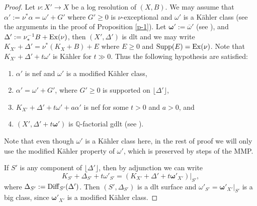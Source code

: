\documentclass[12pt]{amsart}
\theoremstyle{plain}
\theoremstyle{remark}
\theoremstyle{definition}
\newcommand{\<}{\leq}
\newcommand{\Q}{{\mathbb{Q}}}
\newcommand{\Supp}{{\rm Supp}}
\def\bomega{\boldsymbol{\omega}}
\def\Ex{\operatorname{Ex}}
\theoremstyle{definition}
\theoremstyle{definition}
\numberwithin{equation}{section}
\theoremstyle{remark}
\begin{document}
\begin{proof} Let $\nu:X'\to X$ be a log resolution of $(X, B)$. We may assume that $\alpha ':=\nu ^*\alpha =\omega '+G'$ where $G'\geq 0$ is $\nu$-exceptional and $\omega '$ is a K\"ahler class (see the arguments in the proof of Proposition \ref{p-1}). Let $\bomega':=\overline{\omega}'$ (see \cite[Subsection 2.1]{DHY23}), and $\Delta':=\nu ^{-1}_*B+{\rm Ex}(\nu)$, then $(X',\Delta' )$ is dlt and we may write  $K_{X'}+\Delta '=\nu ^*(K_X+B)+E$ where $E\geq 0$ and $\Supp(E)=\Ex(\nu)$.
Note that $K_{X'}+\Delta '+t\omega '$ is K\"ahler for $t\gg 0$.
Thus
 the following hypothesis are satisfied:
\begin{enumerate}
\item $\alpha '$ is nef and $\omega '$ is a modified K\"ahler class, 
\item $\alpha '=\omega '+G'$, where $G'\geq 0$ is supported on $\lfloor \Delta '\rfloor$,
    \item $K_{X'}+\Delta '+t\omega '+a\alpha '$ is nef for some $t>0$ and $a>0$, and
    \item $(X',\Delta '+t\bomega ')$ is $\Q$-factorial gdlt (see \cite[Subsection 2.1]{DHY23}).
\end{enumerate}
Note that even though $\omega'$ is a K\"ahler class here, in the rest of proof we will only use the modified K\"ahler property of $\omega'$, which is preserved by steps of the MMP. 

If $S'$ is any component of $\lfloor \Delta '\rfloor$, then by adjunction we can write 
\[K_{S'}+\Delta _{S'}+t\omega' _{S'}=(K_{X'}+\Delta'+t\bomega'_{X'})|_{S'},\]
where $\Delta _{S'}:={\rm Diff}_{S'}(\Delta ')$.
Then $(S',\Delta _{S'})$ is a dlt surface and $\omega' _{S'}={\bomega'_{X'}}|_{S'}$ %
is a big class, since $\bomega'_{X'}$ is a modified K\"ahler class. 


\end{proof}
\end{document}
